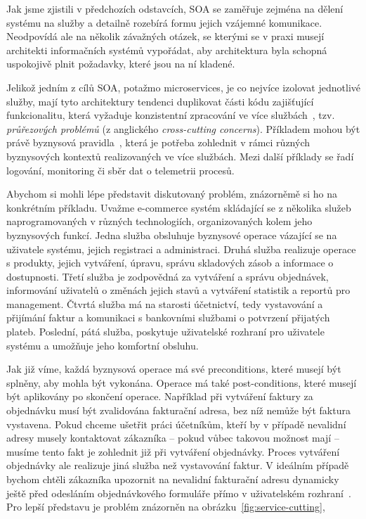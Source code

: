 Jak jsme zjistili v předchozích odstavcích, SOA se zaměřuje zejména na
dělení systému na služby a detailně rozebírá formu jejich vzájemné komunikace.
Neodpovídá ale na několik závažných otázek, se kterými se v praxi musejí
architekti informačních systémů vypořádat, aby architektura byla schopná uspokojivě
plnit požadavky, které jsou na ní kladené.

Jelikož jedním z cílů SOA, potažmo microservices, je co nejvíce izolovat
jednotlivé služby, mají tyto architektury tendenci duplikovat části kódu
zajišťující funkcionalitu, která vyžaduje konzistentní zpracování ve více
službách~\cite{cerny2017disambiguation}, tzv. \textit{průřezových
problémů} (z anglického \textit{cross-cutting concerns}).
Příkladem mohou být právě byznysová pravidla~\cite{cemus2014aspect}, která je potřeba
zohlednit v rámci různých byznysových kontextů realizovaných ve více službách.
Mezi další příklady se řadí logování, monitoring či sběr dat
o telemetrii procesů.

Abychom si mohli lépe představit diskutovaný problém, znázorněmě
si ho na konkrétním příkladu. Uvažme e-commerce systém
skládající se z několika služeb naprogramovaných v různých technologiích,
organizovaných kolem jeho byznysových funkcí.
Jedna služba obsluhuje byznysové operace vázající
se na uživatele systému, jejich registraci a administraci. Druhá
služba realizuje operace s produkty, jejich vytváření, úpravu,
správu skladových zásob a informace o dostupnosti. Třetí služba je
zodpovědná za vytváření a správu objednávek, informování uživatelů
o změnách jejich stavů a vytváření statistik a reportů pro management.
Čtvrtá služba má na starosti účetnictví, tedy vystavování a přijímání
faktur a komunikaci s bankovními službami o potvrzení přijatých plateb.
Poslední, pátá služba, poskytuje uživatelské rozhraní pro uživatele
systému a umožňuje jeho komfortní obsluhu.

Jak již víme, každá byznysová operace má své preconditions, které musejí být splněny,
aby mohla být vykonána. Operace má také post-conditions, které musejí být
aplikovány po skončení operace. Například při vytváření faktury za
objednávku musí být zvalidována fakturační adresa, bez níž nemůže
být faktura vystavena. Pokud chceme ušetřit práci účetníkům, kteří by
v případě nevalidní adresy musely kontaktovat zákazníka – pokud vůbec
takovou možnost mají – musíme tento fakt je zohlednit již při vytváření objednávky.
Proces vytváření objednávky ale realizuje jiná služba než vystavování faktur.
V ideálním případě bychom chtěli zákazníka upozornit na nevalidní fakturační
adresu dynamicky ještě před odesláním objednávkového formuláře přímo v uživatelském
rozhraní~\cite{cemus2017separation}. Pro lepší představu je problém znázorněn na
obrázku~\ref{fig:service-cutting},

